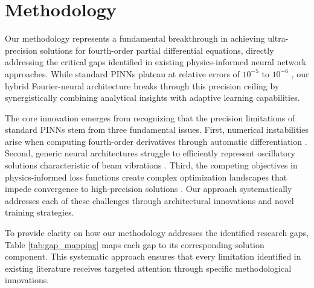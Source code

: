 \section{Methodology}\label{sec:method}

Our methodology represents a fundamental breakthrough in achieving ultra-precision solutions for fourth-order partial differential equations, directly addressing the critical gaps identified in existing physics-informed neural network approaches. While standard PINNs plateau at relative errors of $10^{-5}$ to $10^{-6}$ \cite{vahab2022physics,kapoor2023physics}, our hybrid Fourier-neural architecture breaks through this precision ceiling by synergistically combining analytical insights with adaptive learning capabilities.

The core innovation emerges from recognizing that the precision limitations of standard PINNs stem from three fundamental issues. First, numerical instabilities arise when computing fourth-order derivatives through automatic differentiation \cite{hu2024hutchinson}. Second, generic neural architectures struggle to efficiently represent oscillatory solutions characteristic of beam vibrations \cite{brunton2024machine}. Third, the competing objectives in physics-informed loss functions create complex optimization landscapes that impede convergence to high-precision solutions \cite{wang2021understanding,krishnapriyan2021characterizing}. Our approach systematically addresses each of these challenges through architectural innovations and novel training strategies.

To provide clarity on how our methodology addresses the identified research gaps, Table \ref{tab:gap_mapping} maps each gap to its corresponding solution component. This systematic approach ensures that every limitation identified in existing literature receives targeted attention through specific methodological innovations.

